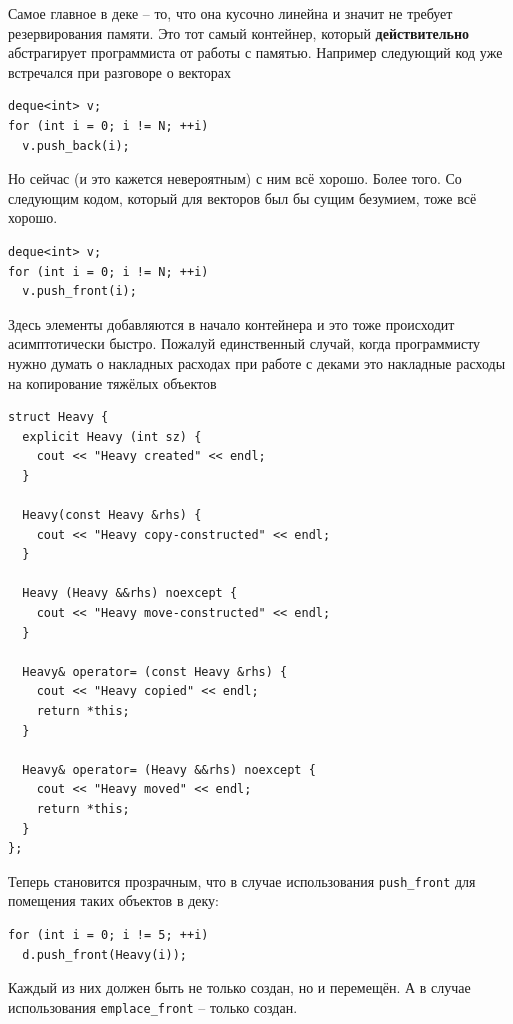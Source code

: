 \documentclass[a4paper,12pt,oneside]{article}
\newif\ifanswers
\begin{document}
\ifanswers
Правильный ответ: последовательность кусков памяти фиксированного размера, связанных общей таблицей-заголовком
\fi

Самое главное в деке -- то, что она кусочно линейна и значит не требует резервирования памяти. Это тот самый контейнер, который \textbf{действительно} абстрагирует программиста от работы с памятью. Например следующий код уже встречался при разговоре о векторах

\begin{lstlisting}
deque<int> v;
for (int i = 0; i != N; ++i)
  v.push_back(i);
\end{lstlisting}

Но сейчас (и это кажется невероятным) с ним всё хорошо. Более того. Со следующим кодом, который для векторов был бы сущим безумием, тоже всё хорошо.

\begin{lstlisting}
deque<int> v;
for (int i = 0; i != N; ++i)
  v.push_front(i);
\end{lstlisting}

Здесь элементы добавляются в начало контейнера и это тоже происходит асимптотически быстро. Пожалуй единственный случай, когда программисту нужно думать о накладных расходах при работе с деками это накладные расходы на копирование тяжёлых объектов

\begin{lstlisting}
struct Heavy {
  explicit Heavy (int sz) {
    cout << "Heavy created" << endl;
  }

  Heavy(const Heavy &rhs) {
    cout << "Heavy copy-constructed" << endl;
  }

  Heavy (Heavy &&rhs) noexcept {
    cout << "Heavy move-constructed" << endl;
  }

  Heavy& operator= (const Heavy &rhs) {
    cout << "Heavy copied" << endl;
    return *this;
  }

  Heavy& operator= (Heavy &&rhs) noexcept {
    cout << "Heavy moved" << endl;
    return *this;
  }
};
\end{lstlisting}

Теперь становится прозрачным, что в случае использования \lstinline!push_front! для помещения таких объектов в деку:

\begin{lstlisting}
for (int i = 0; i != 5; ++i)
  d.push_front(Heavy(i));
\end{lstlisting}

Каждый из них должен быть не только создан, но и перемещён. А в случае использования \lstinline!emplace_front! -- только создан.
\end{document}
